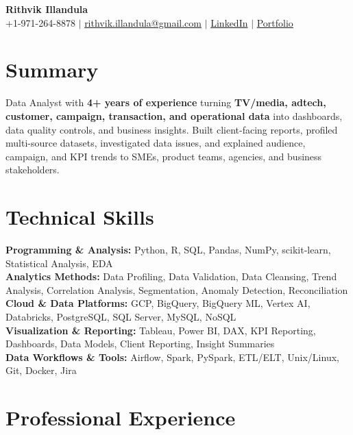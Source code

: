 \documentclass[letterpaper,11pt]{article}
\begin{document}
\begin{center}
    {\Large \textbf{Rithvik Illandula}}\\[-1pt]
    +1-971-264-8878 $|$
    \href{mailto:rithvik.illandula@gmail.com}{rithvik.illandula@gmail.com} $|$
    \href{https://www.linkedin.com/in/rithvik-illandula/}{LinkedIn} $|$
    \href{https://rithvikillandula.github.io/My-Portfolio/}{Portfolio}
\end{center}
\vspace{-16pt}

\section*{Summary}

Data Analyst with \textbf{4+ years of experience} turning \textbf{TV/media, adtech, customer, campaign, transaction, and operational data} into dashboards, data quality controls, and business insights. Built client-facing reports, profiled multi-source datasets, investigated data issues, and explained audience, campaign, and KPI trends to SMEs, product teams, agencies, and business stakeholders.

\section*{Technical Skills}

\textbf{Programming \& Analysis:} Python, R, SQL, Pandas, NumPy, scikit-learn, Statistical Analysis, EDA\\[-1pt]
\textbf{Analytics Methods:} Data Profiling, Data Validation, Data Cleansing, Trend Analysis, Correlation Analysis, Segmentation, Anomaly Detection, Reconciliation\\[-1pt]
\textbf{Cloud \& Data Platforms:} GCP, BigQuery, BigQuery ML, Vertex AI, Databricks, PostgreSQL, SQL Server, MySQL, NoSQL\\[-1pt]
\textbf{Visualization \& Reporting:} Tableau, Power BI, DAX, KPI Reporting, Dashboards, Data Models, Client Reporting, Insight Summaries\\[-1pt]
\textbf{Data Workflows \& Tools:} Airflow, Spark, PySpark, ETL/ELT, Unix/Linux, Git, Docker, Jira

\section*{Professional Experience}
\end{document}

